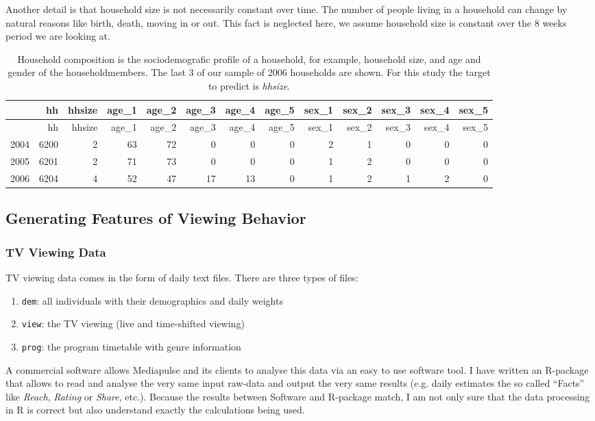 \documentclass[]{article}
\providecommand{\tightlist}{%
  \setlength{\itemsep}{0pt}\setlength{\parskip}{0pt}}
\begin{document}
Another detail is that household size is not necessarily constant over
time. The number of people living in a household can change by natural
reasons like birth, death, moving in or out. This fact is neglected
here, we assume household size is constant over the 8 weeks period we
are looking at.

\begin{longtable}[]{@{}lrrrrrrrrrrrr@{}}
\caption{Household composition is the sociodemografic profile of a
household, for example, household size, and age and gender of the
householdmembers. The last 3 of our sample of 2006 households are shown.
For this study the target to predict is \emph{hhsize}.}\tabularnewline
\toprule
& hh & hhsize & age\_1 & age\_2 & age\_3 & age\_4 & age\_5 & sex\_1 &
sex\_2 & sex\_3 & sex\_4 & sex\_5\tabularnewline
\midrule
\endfirsthead
\toprule
& hh & hhsize & age\_1 & age\_2 & age\_3 & age\_4 & age\_5 & sex\_1 &
sex\_2 & sex\_3 & sex\_4 & sex\_5\tabularnewline
\midrule
\endhead
2004 & 6200 & 2 & 63 & 72 & 0 & 0 & 0 & 2 & 1 & 0 & 0 & 0\tabularnewline
2005 & 6201 & 2 & 71 & 73 & 0 & 0 & 0 & 1 & 2 & 0 & 0 & 0\tabularnewline
2006 & 6204 & 4 & 52 & 47 & 17 & 13 & 0 & 1 & 2 & 1 & 2 &
0\tabularnewline
\bottomrule
\end{longtable}

\subsection{Generating Features of Viewing
Behavior}\label{generating-features-of-viewing-behavior}

\subsubsection{TV Viewing Data}\label{tv-viewing-data}

TV viewing data comes in the form of daily text files. There are three
types of files:

\begin{enumerate}
\def\labelenumi{\arabic{enumi}.}
\tightlist
\item
  \texttt{dem}: all individuals with their demographics and daily
  weights
\item
  \texttt{view}: the TV viewing (live and time-shifted viewing)
\item
  \texttt{prog}: the program timetable with genre information
\end{enumerate}

A commercial software allows Mediapulse and its clients to analyse this
data via an easy to use software tool. I have written an R-package that
allows to read and analyse the very same input raw-data and output the
very same results (e.g. daily estimates the so called ``Facts'' like
\emph{Reach}, \emph{Rating} or \emph{Share}, etc.). Because the results
between Software and R-package match, I am not only sure that the data
processing in R is correct but also understand exactly the calculations
being used.
\end{document}
